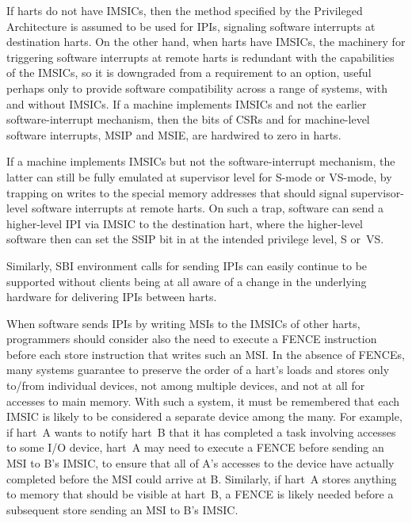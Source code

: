 If harts do not have IMSICs, then the method specified by the {\RISCV}
Privileged Architecture is assumed to be used for IPIs, signaling software
interrupts at destination harts.
On the other hand, when harts have IMSICs, the machinery for triggering
software interrupts at remote harts is redundant with the capabilities
of the IMSICs, so it is downgraded from a requirement to an option,
useful perhaps only to provide software compatibility across a range
of {\RISCV} systems, with and without IMSICs.
If a machine implements IMSICs and not the earlier software-interrupt
mechanism, then the bits of CSRs  and  for machine-level
software interrupts, MSIP and MSIE, are hardwired to zero in harts.

\begin{commentary}
If a machine implements IMSICs but not the software-interrupt
mechanism, the latter can still be fully emulated at supervisor level
for \mbox{S-mode} or \mbox{VS-mode}, by trapping on writes to the
special memory addresses that should signal supervisor-level software
interrupts at remote harts.
On such a trap, software can send a higher-level IPI via IMSIC to the
destination hart, where the higher-level software then can set the
SSIP bit in  at the intended privilege level, S or~VS.

Similarly, SBI environment calls for sending IPIs can easily continue to
be supported without clients being at all aware of a change in the
underlying hardware for delivering IPIs between harts.
\end{commentary}

\begin{commentary}
When software sends IPIs by writing MSIs to the IMSICs of other
harts, programmers should consider also the need to execute a FENCE
instruction before each store instruction that writes such an MSI.
In the absence of FENCEs, many systems guarantee to preserve the
order of a hart's loads and stores only to/from individual devices,
not among multiple devices, and not at all for accesses to main memory.
With such a system, it must be remembered that each IMSIC
is likely to be considered a separate device among the many.
For example, if hart~A wants to notify hart~B that it has
completed a task involving accesses to some I/O device,
hart~A may need to execute a FENCE before sending an MSI to
B's IMSIC, to ensure that all of A's accesses to the device
have actually completed before the MSI could arrive at B.
Similarly, if hart~A stores anything to memory that
should be visible at hart~B, a FENCE is likely needed
before a subsequent store sending an MSI to B's IMSIC.
\end{commentary}

